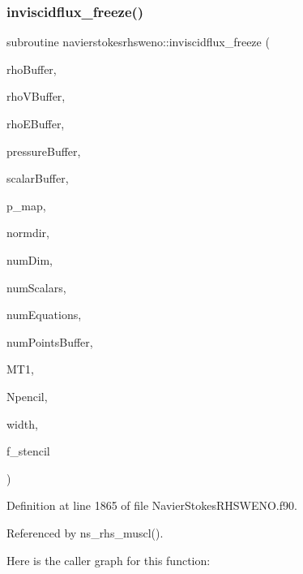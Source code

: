 \subsubsection{\texorpdfstring{inviscidflux\+\_\+freeze()}{inviscidflux\_freeze()}}
{\footnotesize\ttfamily subroutine navierstokesrhsweno\+::inviscidflux\+\_\+freeze (\begin{DoxyParamCaption}\item[{real(kind=8), dimension(numpointsbuffer), intent(in)}]{rho\+Buffer,  }\item[{real(kind=8), dimension(numdim$\ast$numpointsbuffer), intent(in), target}]{rho\+V\+Buffer,  }\item[{real(kind=8), dimension(numpointsbuffer), intent(in)}]{rho\+E\+Buffer,  }\item[{real(kind=8), dimension(numpointsbuffer), intent(in)}]{pressure\+Buffer,  }\item[{real(kind=8), dimension(numscalars$\ast$numpointsbuffer), intent(in), target}]{scalar\+Buffer,  }\item[{integer(kind=8), dimension(\+:), intent(in)}]{p\+\_\+map,  }\item[{integer(kind=4)}]{normdir,  }\item[{integer(kind=4)}]{num\+Dim,  }\item[{integer(kind=4)}]{num\+Scalars,  }\item[{integer(kind=4)}]{num\+Equations,  }\item[{integer(kind=8)}]{num\+Points\+Buffer,  }\item[{real(kind=8), dimension(numdim), intent(in)}]{M\+T1,  }\item[{integer(kind=4)}]{Npencil,  }\item[{integer(kind=4)}]{width,  }\item[{real(kind=8), dimension(npencil,numequations), intent(out)}]{f\+\_\+stencil }\end{DoxyParamCaption})}



Definition at line 1865 of file Navier\+Stokes\+R\+H\+S\+W\+E\+N\+O.\+f90.



Referenced by ns\+\_\+rhs\+\_\+muscl().

Here is the caller graph for this function\+:
\hypertarget{namespacenavierstokesrhsweno_adc0cae81dfd0f35fb63adedfe8e322ea}{}\label{namespacenavierstokesrhsweno_adc0cae81dfd0f35fb63adedfe8e322ea} 
